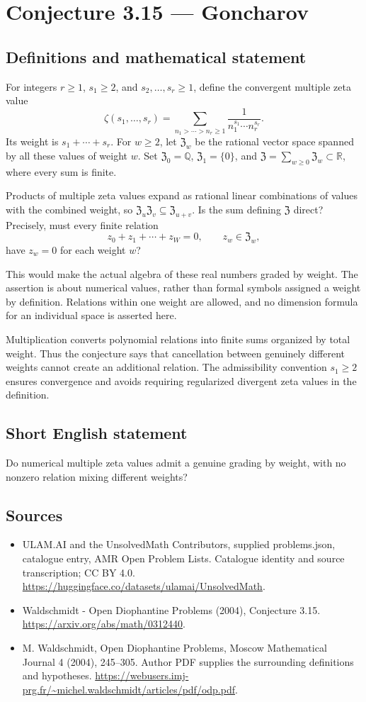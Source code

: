 \documentclass[11pt,a4paper]{article}
\begin{document}
\section*{Conjecture 3.15 — Goncharov}\label{statement}

\subsection{Definitions and mathematical statement}
For integers $r\ge1$, $s_1\ge2$, and $s_2,\ldots,s_r\ge1$, define the convergent multiple zeta value
\[
\zeta(s_1,\ldots,s_r)=
\sum_{n_1>\cdots>n_r\ge1}\frac1{n_1^{s_1}\cdots n_r^{s_r}}.
\]
Its weight is $s_1+\cdots+s_r$. For $w\ge2$, let $\mathfrak Z_w$ be the rational vector space spanned by all these values of weight $w$. Set $\mathfrak Z_0=\mathbb Q$, $\mathfrak Z_1=\{0\}$, and $\mathfrak Z=\sum_{w\ge0}\mathfrak Z_w\subset\mathbb R$, where every sum is finite.

Products of multiple zeta values expand as rational linear combinations of values with the combined weight, so $\mathfrak Z_u\mathfrak Z_v\subseteq\mathfrak Z_{u+v}$. Is the sum defining $\mathfrak Z$ direct? Precisely, must every finite relation
\[
z_0+z_1+\cdots+z_W=0,\qquad z_w\in\mathfrak Z_w,
\]
have $z_w=0$ for each weight $w$?

This would make the actual algebra of these real numbers graded by weight. The assertion is about numerical values, rather than formal symbols assigned a weight by definition. Relations within one weight are allowed, and no dimension formula for an individual space is asserted here.

Multiplication converts polynomial relations into finite sums organized by total weight. Thus the conjecture says that cancellation between genuinely different weights cannot create an additional relation. The admissibility convention $s_1\ge2$ ensures convergence and avoids requiring regularized divergent zeta values in the definition.
\subsection{Short English statement}
Do numerical multiple zeta values admit a genuine grading by weight, with no nonzero relation mixing different weights?
\subsection{Sources}
\begin{itemize}
\item[S1] ULAM.AI and the UnsolvedMath Contributors, supplied problems.json, catalogue entry, AMR Open Problem Lists. Catalogue identity and source transcription; CC BY 4.0.
\url{https://huggingface.co/datasets/ulamai/UnsolvedMath}.
\item[S2] Waldschmidt - Open Diophantine Problems (2004), Conjecture 3.15. 
\url{https://arxiv.org/abs/math/0312440}.
\item[S3] M. Waldschmidt, Open Diophantine Problems, Moscow Mathematical Journal 4 (2004), 245–305. Author PDF supplies the surrounding definitions and hypotheses.
\url{https://webusers.imj-prg.fr/~michel.waldschmidt/articles/pdf/odp.pdf}.
\end{itemize}
\end{document}
